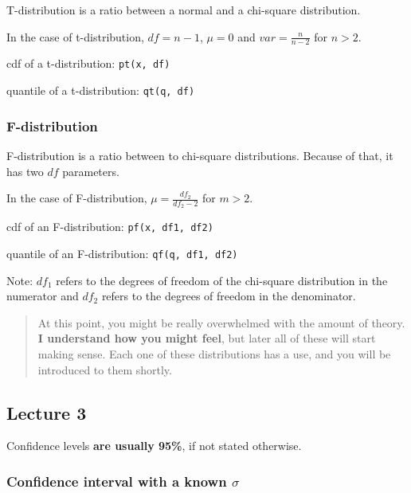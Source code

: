 T-distribution is a ratio between a normal and a chi-square
distribution.

In the case of t-distribution, \(df = n - 1\), \(\mu = 0\) and
\(var = \frac{n}{n-2}\) for \(n>2\).

cdf of a t-distribution: \texttt{pt(x,\ df)}

quantile of a t-distribution: \texttt{qt(q,\ df)}

\hypertarget{f-distribution}{%
\subsubsection{F-distribution}\label{f-distribution}}

F-distribution is a ratio between to chi-square distributions. Because
of that, it has two \(df\) parameters.

In the case of F-distribution, \(\mu = \frac{df_2}{df_2 - 2}\) for
\(m>2\).

cdf of an F-distribution: \texttt{pf(x,\ df1,\ df2)}

quantile of an F-distribution: \texttt{qf(q,\ df1,\ df2)}

Note: \(df_1\) refers to the degrees of freedom of the chi-square
distribution in the numerator and \(df_2\) refers to the degrees of
freedom in the denominator.

\begin{quote}
At this point, you might be really overwhelmed with the amount of
theory. \textbf{I understand how you might feel}, but later all of these
will start making sense. Each one of these distributions has a use, and
you will be introduced to them shortly.
\end{quote}

\hypertarget{lecture-3}{%
\subsection{Lecture 3}\label{lecture-3}}

Confidence levels \textbf{are usually 95\%}, if not stated otherwise.

\hypertarget{confidence-interval-with-a-known-sigma}{%
\subsubsection{\texorpdfstring{Confidence interval with a known
\(\sigma\)}{Confidence interval with a known \textbackslash sigma}}\label{confidence-interval-with-a-known-sigma}}

\hypertarget{section}{%
\subsubsection{}\label{section}}

